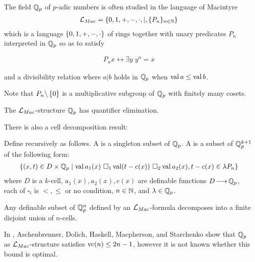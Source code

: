 
The field $\mathbb{Q}_p$ of $p$-adic numbers is often studied in the language of Macintyre 
  \begin{align*}
	\mathcal L_{Mac} = \left\{0, 1, +, -, \cdot, |, \{P_n\}_{n \in \mathbb{N}}\right\}
  \end{align*}
which is a language $\left\{0, 1, +, -, \cdot\right\}$ of rings together with unary predicates $P_n$ interpreted in $\mathbb{Q}_p$ so as to satisfy

\begin{align*}
  P_n x \leftrightarrow \exists y \; y^n = x
\end{align*}

and a divisibility relation where $a|b$ holds in $\mathbb{Q}_p$ when $\operatorname{val} a \leq \operatorname{val} b$.

Note that $P_n\backslash \left\{0\right\}$ is a multiplicative subgroup of $\mathbb{Q}_p$ with finitely many cosets.

\begin{Theorem} [Macintyre '76]
  The $\mathcal L_{Mac}$-structure $\mathbb{Q}_p$ has quantifier elimination.
\end{Theorem}

There is also a cell decomposition result:
\begin{Definition}
  Define  recursively as follows.
  A  is a singleton subset of $\mathbb{Q}_p$.
  A  is a subset of $\mathbb{Q}_p^{k+1}$ of the following form:
  \begin{align*}
    \left\{(x, t) \in D \times \mathbb{Q}_p \mid \operatorname{val} a_1(x) \ \square_1 \operatorname{val} (t - c(x)) \ \square_2 \operatorname{val} a_2(x), t - c(x) \in \lambda P_n\right\}
  \end{align*}
  where $D$ is a $k$-cell,
  $a_1(x), a_2(x), c(x)$ are definable functions $D \operatorname{\longrightarrow} \mathbb{Q}_p$,
  each of $\square_i$ is $<, \leq$ or no condition,
  $n \in \mathbb{N}$,
  and
  $\lambda \in \mathbb{Q}_p$.    
\end{Definition}

\begin{Theorem} [Denef '84]
  Any definable subset of $\mathbb{Q}_p^n$ defined by an $\mathcal L_{Mac}$-formula decomposes into a finite disjoint union of $n$-cells.
\end{Theorem}  

In \cite{density}, Aschenbrenner, Dolich, Haskell, Macpherson, and Starchenko show that $\mathbb{Q}_p$ as $\mathcal L_{Mac}$-structure satisfies $\operatorname{vc}(n) \leq 2n - 1$,
however it is not known whether this bound is optimal.

